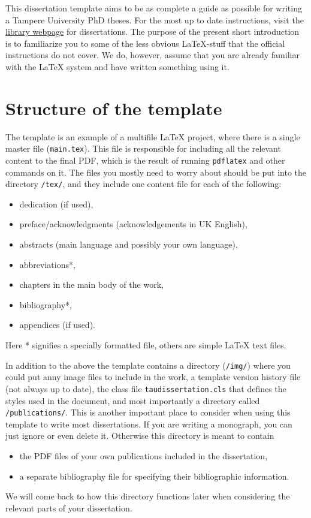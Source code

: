 This dissertation template aims to be as complete a guide as possible for writing a Tampere University PhD theses. For the most up to date instructions, visit the \href{https://libguides.tuni.fi/dissertationpublishing}{library webpage} for dissertations. The purpose of the present short introduction is to familiarize you to some of the less obvious \LaTeX-stuff that the official instructions do not cover. We do, however, assume that you are already familiar with the \LaTeX{} system and have written something using it.

\section{Structure of the template}

The template is an example of a multifile \LaTeX{} project, where there is a single master file (\texttt{main.tex}). This file is responsible for including all the relevant content to the final PDF, which is the result of running \texttt{pdflatex} and other commands on it. The files you mostly need to worry about should be put into the directory \texttt{/tex/}, and they include one content file for each of the following:
\begin{itemize}
\item dedication (if used),
\item preface/acknowledgments (acknowledgements in UK English),
\item abstracts (main language and possibly your own language),
\item abbreviations*,
\item chapters in the main body of the work,
\item bibliography*,
\item appendices (if used).
\end{itemize}
Here * signifies a specially formatted file, others are simple \LaTeX{} text files.

In addition to the above the template contains a directory (\texttt{/img/}) where you could put anny image files to include in the work, a template version history file (not always up to date), the class file \texttt{taudissertation.cls} that defines the styles used in the document, and most importantly a directory called \texttt{/publications/}. This is another important place to consider when using this template to write most dissertations. If you are writing a monograph, you can just ignore or even delete it. Otherwise this directory is meant to contain
\begin{itemize}
\item the PDF files of your own publications included in the dissertation,
\item a separate bibliography file for specifying their bibliographic information.
\end{itemize}
We will come back to how this directory functions later when considering the relevant parts of your dissertation.

